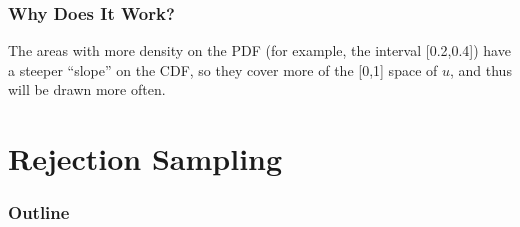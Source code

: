 \documentclass[handout]{beamer}
\begin{document}
\begin{frame}
\frametitle{Why Does It Work?}
\pause
\begin{figure}[!htp]
\begin{center}
\end{center}
\end{figure}
\pause
The areas with more density on the PDF (for example, the interval [0.2,0.4])
have a steeper ``slope'' on the CDF, so they cover more of the [0,1]
space of $u$, and thus will be drawn more often.
\end{frame}

\section{Rejection Sampling}

\begin{frame}
\frametitle{Outline}
\tableofcontents[currentsection]
\end{frame}
\end{document}
